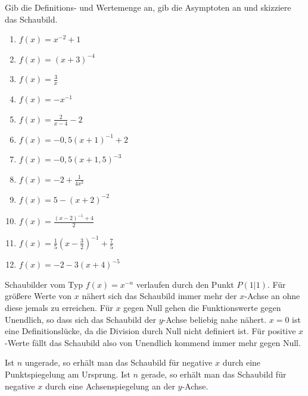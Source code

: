 \begin{Exercise}[title={}, label=HyperbelAllgemein]
	
	Gib die Definitions- und Wertemenge an, gib die Asymptoten an und skizziere das Schaubild.
	
	\begin{minipage}{\textwidth}
		\begin{minipage}{0.5\textwidth}
			\begin{enumerate}[label=\alph*)]
				\item \(f(x)=x^{-2}+1\)
				\item \(f(x)=\left(x+3\right)^{-4}\)
				\item \(f(x)=\frac{3}{x}\)
				\item \(f(x)=-x^{-1}\)
				\item \(f(x)=\frac{2}{x-4}-2\)
				\item \(f(x)=-0,5\left(x+1\right)^{-1}+2\)
			\end{enumerate}
		\end{minipage}%
		\begin{minipage}{0.5\textwidth}
			\begin{enumerate}[label=\alph*)]
				\setcounter{enumi}{6}
				\item \(f(x)=-0,5\left(x+1,5\right)^{-3}\)
				\item \(f(x)=-2+\frac{1}{4x^2}\)
				\item \(f(x)=5-\left(x+2\right)^{-2}\)
				\item \(f(x)=\frac{\left(x-2\right)^{-1}+4}{2}\)
				\item \(f(x)=\frac{1}{5}\left(x-\frac{3}{2}\right)^{-1}+\frac{7}{5}\)
				\item \(f(x)=-2-3\left(x+4\right)^{-5}\)
			\end{enumerate}
		\end{minipage}%
	\end{minipage}
\end{Exercise}
\newpage
\begin{Answer}[ref=HyperbelA1]
	Schaubilder vom Typ \(f(x)=x^{-n}\) verlaufen durch den Punkt \(P(1\vert 1)\). Für größere Werte von \(x\) nähert sich das Schaubild immer mehr der \(x\)-Achse an ohne diese jemals zu erreichen. Für \(x\) gegen Null gehen die Funktionswerte gegen Unendlich, so dass sich das Schaubild der \(y\)-Achse beliebig nahe nähert. \(x=0\) ist eine Definitionslücke, da die Division durch Null nicht definiert ist. Für positive \(x\)-Werte fällt das Schaubild also von Unendlich kommend immer mehr gegen Null. 
	
	Ist \(n\) ungerade, so erhält man das Schaubild für negative \(x\) durch eine Punktspiegelung am Ursprung. Ist \(n\) gerade, so erhält man das Schaubild für negative \(x\) durch eine Achsenspiegelung an der \(y\)-Achse.
\end{Answer}
